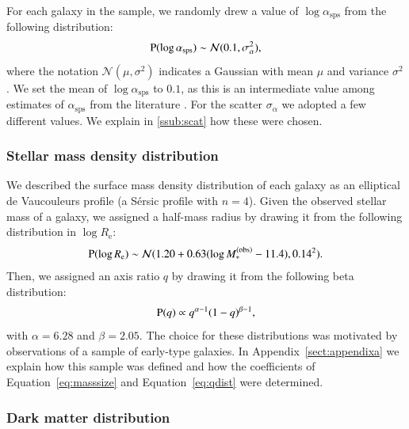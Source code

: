 \documentclass{aa}
\def\reff{R_{\mathrm{e}}}
\def\asps{\alpha_{\mathrm{sps}}}
\def\mobs{M_*^{(\mathrm{obs})}}
\def\Eref#1{Equation~\ref{#1}\xspace}
\def\pr{{\rm P}}
\begin{document}
For each galaxy in the sample, we randomly drew a value of $\log{\asps}$ from the following distribution:
\begin{equation}
\pr(\log{\asps}) \sim \mathcal{N}(0.1, \sigma_\alpha^2),
\end{equation}
where the notation $\mathcal{N}(\mu,\sigma^2)$ indicates a Gaussian with mean $\mu$ and variance $\sigma^2$.
We set the mean of $\log{\asps}$ to $0.1$, as this is an intermediate value among estimates of $\asps$ from the literature \citep{CvD12, Cap++13, SLC15, Son++15, Son++19}.
For the scatter $\sigma_\alpha$ we adopted a few different values. We explain in \ref{ssub:scat} how these were chosen.


\subsubsection{Stellar mass density distribution}

We described the surface mass density distribution of each galaxy as an elliptical de Vaucouleurs profile (a S\'{e}rsic profile with $n=4$).
Given the observed stellar mass of a galaxy, we assigned a half-mass radius by drawing it from the following distribution in $\log{\reff}$:
\begin{equation}\label{eq:masssize}
\pr(\log{\reff}) \sim \mathcal{N}(1.20 + 0.63(\log{\mobs} - 11.4), 0.14^2).
\end{equation}
Then, we assigned an axis ratio $q$ by drawing it from the following beta distribution:
\begin{equation}\label{eq:qdist}
\pr(q) \propto q^{\alpha-1}(1 - q)^{\beta-1},
\end{equation}
with $\alpha=6.28$ and $\beta=2.05$.
The choice for these distributions was motivated by observations of a sample of early-type galaxies. In Appendix~\ref{sect:appendixa} we explain how this sample was defined and how the coefficients of \Eref{eq:masssize} and \Eref{eq:qdist} were determined. 

\subsubsection{Dark matter distribution}\label{ssub:dmprofile}
\end{document}
